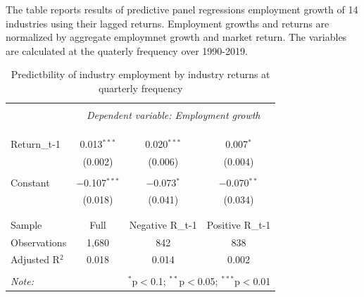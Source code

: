 \documentclass[12pt]{article}
\begin{document}
\begin{table}[!htbp] \centering 
  \caption{Predictbility of industry employment by industry returns at quarterly frequency} 
  \label{}
    \begin{flushleft}
    {\medskip\small
 The table reports results of predictive panel regressions employment growth of 14 industries using their lagged returns. Employment growths and returns are normalized by aggregate employmnet growth and market return. The variables are calculated at the quaterly frequency over 1990-2019.}
    \medskip
    \end{flushleft}
\begin{tabular}{@{\extracolsep{5pt}}lccc} 
\\[-1.8ex]\hline 
\hline \\[-1.8ex] 
 & \multicolumn{3}{c}{\textit{Dependent variable: Employment growth}} \\ 
\cline{2-4} 
\\[-1.8ex] \\
\hline \\[-1.8ex] 
  Return_{t-1} & 0.013$^{***}$ & 0.020$^{***}$ & 0.007$^{*}$ \\ 
  & (0.002) & (0.006) & (0.004) \\ 
  & & & \\ 
 Constant & $-$0.107$^{***}$ & $-$0.073$^{*}$ & $-$0.070$^{**}$ \\ 
  & (0.018) & (0.041) & (0.034) \\ 
  & & & \\ 
\hline \\[-1.8ex] 
Sample & Full & Negative R_{t-1} & Positive R_{t-1} \\
Observations & 1,680 & 842 & 838 \\ 
Adjusted R$^{2}$ & 0.018 & 0.014 & 0.002 \\ 
\hline 
\hline \\[-1.8ex] 
\textit{Note:}  & \multicolumn{3}{r}{$^{*}$p$<$0.1; $^{**}$p$<$0.05; $^{***}$p$<$0.01} \\ 
\end{tabular} 
\end{table}
\end{document}
